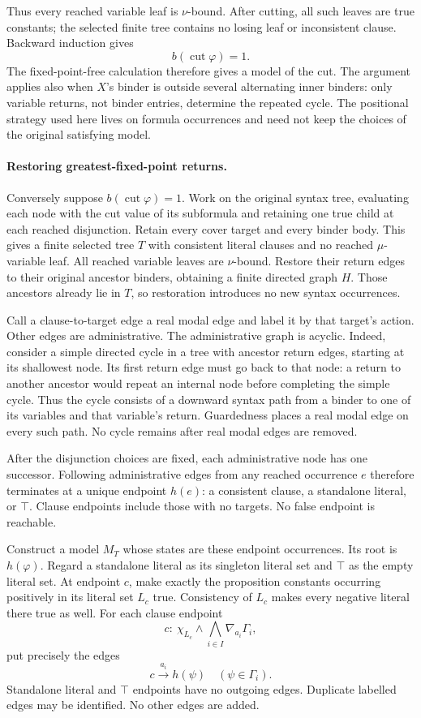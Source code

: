Thus every reached variable
leaf is \(\nu\)-bound.
After cutting, all such
leaves are true constants;
the selected finite tree
contains no losing leaf
or inconsistent clause.
Backward induction gives
\[
 b(\operatorname{cut}\varphi)=1.
\]
The fixed-point-free calculation
therefore gives a model of
the cut. The argument applies
also when \(X\)'s binder is
outside several alternating
inner binders: only variable
returns, not binder entries,
determine the repeated cycle.
The positional strategy used
here lives on formula occurrences
and need not keep the choices
of the original satisfying
model.

\paragraph{Restoring greatest-fixed-point returns.}
\label{sec:p09-mu-anf-cut-model}
Conversely suppose
\(b(\operatorname{cut}\varphi)=1\).
Work on the original syntax
tree, evaluating each node
with the cut value of
its subformula and retaining
one true child at each
reached disjunction.
Retain every cover target
and every binder body.
This gives a finite selected
tree \(T\) with consistent
literal clauses and no
reached \(\mu\)-variable leaf.
All reached variable leaves
are \(\nu\)-bound.
Restore their return edges
to their original ancestor
binders, obtaining a finite
directed graph \(H\).
Those ancestors already lie
in \(T\), so restoration
introduces no new syntax
occurrences.

Call a clause-to-target edge
a real modal edge and label
it by that target's action.
Other edges are administrative.
The administrative graph is
acyclic. Indeed, consider a
simple directed cycle in a
tree with ancestor return
edges, starting at its
shallowest node.
Its first return edge must
go back to that node:
a return to another ancestor
would repeat an internal
node before completing the
simple cycle.
Thus the cycle consists of
a downward syntax path from
a binder to one of its
variables and that variable's
return. Guardedness places
a real modal edge on every
such path. No cycle remains
after real modal edges
are removed.

After the disjunction choices
are fixed, each administrative
node has one successor.
Following administrative edges
from any reached occurrence
\(e\) therefore terminates
at a unique endpoint \(h(e)\):
a consistent clause, a
standalone literal, or \(\top\).
Clause endpoints include
those with no targets.
No false endpoint is
reachable.

Construct a model \(M_T\)
whose states are these
endpoint occurrences.
Its root is \(h(\varphi)\).
Regard a standalone literal
as its singleton literal
set and \(\top\) as the
empty literal set.
At endpoint \(c\), make
exactly the proposition
constants occurring positively
in its literal set \(L_c\)
true. Consistency of \(L_c\)
makes every negative literal
there true as well.
For each clause endpoint
\[
 c:\ \chi_{L_c}\land
          \bigwedge_{i\in I}\nabla_{a_i}\Gamma_i,
\]
put precisely the edges
\[
 c\xrightarrow{a_i}h(\psi)
       \quad(\psi\in\Gamma_i).
\]
Standalone literal and
\(\top\) endpoints have
no outgoing edges.
Duplicate labelled edges
may be identified.
No other edges are added.

